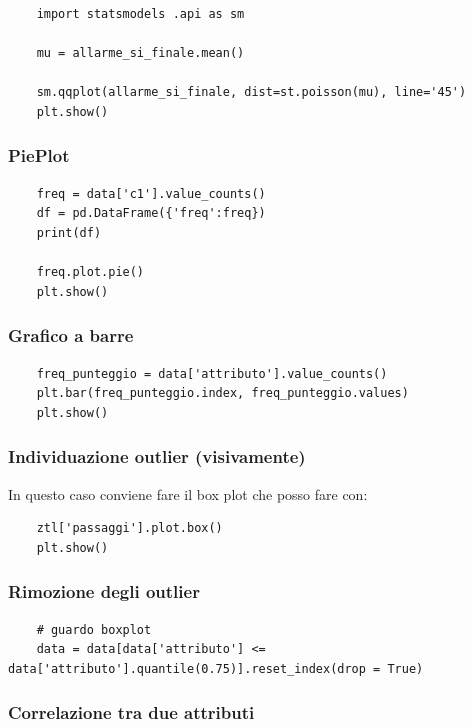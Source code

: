 \documentclass{article}
\begin{document}
\begin{lstlisting}
    import statsmodels .api as sm

    mu = allarme_si_finale.mean()

    sm.qqplot(allarme_si_finale, dist=st.poisson(mu), line='45')
    plt.show()
\end{lstlisting}



\subsubsection*{PiePlot}

\begin{lstlisting}
    freq = data['c1'].value_counts()
    df = pd.DataFrame({'freq':freq})
    print(df)

    freq.plot.pie()
    plt.show()
\end{lstlisting}

\subsubsection*{Grafico a barre}
\begin{lstlisting}
    freq_punteggio = data['attributo'].value_counts()
    plt.bar(freq_punteggio.index, freq_punteggio.values)
    plt.show()
\end{lstlisting}

\subsubsection*{Individuazione outlier (visivamente)}

In questo caso conviene fare il box plot che posso fare con:

\begin{lstlisting}
    ztl['passaggi'].plot.box()
    plt.show()
\end{lstlisting}

\subsubsection*{Rimozione degli outlier}

\begin{lstlisting}
    # guardo boxplot
    data = data[data['attributo'] <= data['attributo'].quantile(0.75)].reset_index(drop = True)
\end{lstlisting}

\subsubsection*{Correlazione tra due attributi}
\end{document}
